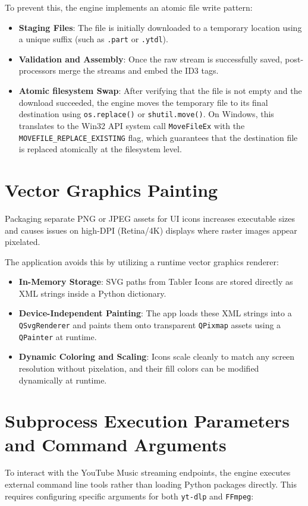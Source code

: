 \documentclass[12pt]{report}
\begin{document}
To prevent this, the engine implements an atomic file write pattern:
\begin{itemize}[leftmargin=*]
    \item \textbf{Staging Files}: The file is initially downloaded to a temporary location using a unique suffix (such as \texttt{.part} or \texttt{.ytdl}).
    \item \textbf{Validation and Assembly}: Once the raw stream is successfully saved, post-processors merge the streams and embed the ID3 tags.
    \item \textbf{Atomic filesystem Swap}: After verifying that the file is not empty and the download succeeded, the engine moves the temporary file to its final destination using \texttt{os.replace()} or \texttt{shutil.move()}. On Windows, this translates to the Win32 API system call \texttt{MoveFileEx} with the \texttt{MOVEFILE\_REPLACE\_EXISTING} flag, which guarantees that the destination file is replaced atomically at the filesystem level.
\end{itemize}

\section{Vector Graphics Painting}
Packaging separate PNG or JPEG assets for UI icons increases executable sizes and causes issues on high-DPI (Retina/4K) displays where raster images appear pixelated.

The application avoids this by utilizing a runtime vector graphics renderer:
\begin{itemize}[leftmargin=*]
    \item \textbf{In-Memory Storage}: SVG paths from Tabler Icons are stored directly as XML strings inside a Python dictionary.
    \item \textbf{Device-Independent Painting}: The app loads these XML strings into a \texttt{QSvgRenderer} and paints them onto transparent \texttt{QPixmap} assets using a \texttt{QPainter} at runtime.
    \item \textbf{Dynamic Coloring and Scaling}: Icons scale cleanly to match any screen resolution without pixelation, and their fill colors can be modified dynamically at runtime.
\end{itemize}

\section{Subprocess Execution Parameters and Command Arguments}
To interact with the YouTube Music streaming endpoints, the engine executes external command line tools rather than loading Python packages directly. This requires configuring specific arguments for both \texttt{yt-dlp} and \texttt{FFmpeg}:
\end{document}
